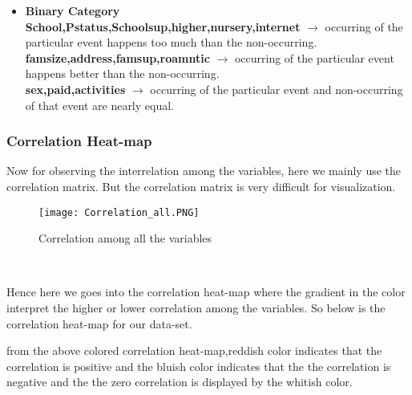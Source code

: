\documentclass[A4paper,11pt]{report}
\begin{document}
	\begin{itemize}
		\vspace{-1cm} \item \textbf{Binary Category}\\
		\textbf{School,Pstatus,Schoolsup,higher,nursery,internet} $\rightarrow$ occurring of the particular event happens too much than the non-occurring.\\
		\textbf{famsize,address,famsup,roamntic} $\rightarrow$ occurring of the particular event happens better than the non-occurring.\\
		\textbf{sex,paid,activities} $\rightarrow$ occurring of the particular event  and non-occurring of that event are nearly equal.\\
	\end{itemize}
\vspace{-1 cm}
	\subsubsection{Correlation Heat-map}
	Now for observing the interrelation among the variables, here we mainly use the correlation matrix. But the correlation matrix is very difficult for visualization.\\
	\begin{figure}[h!]
		\texttt{[image: Correlation\_all.PNG]}
		\caption{Correlation among all the variables}
	\end{figure}\\
	\par  Hence here we goes into the correlation heat-map where the gradient in the color interpret the higher or lower correlation among the variables. So below is the correlation heat-map for our data-set.
	\par from the above colored correlation heat-map,reddish color indicates that the correlation is positive and the bluish color indicates that the the correlation is negative and the the zero correlation is displayed by the whitish color.\\
\end{document}
